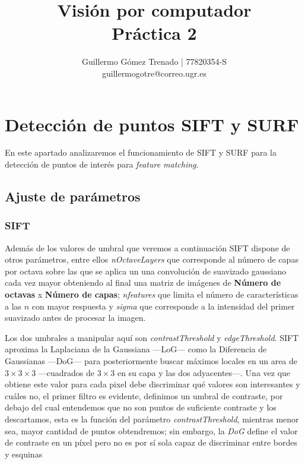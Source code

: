 \documentclass{article}
\title{Visión por computador\\
Práctica 2}
\author{Guillermo G\'omez Trenado | 77820354-S \\
guillermogotre@correo.ugr.es}
\begin{document}

\maketitle

\tableofcontents

\newpage

\section{Detección de puntos SIFT y SURF}

En este apartado analizaremos el funcionamiento de SIFT y SURF para la detección de puntos de interés para \textit{feature matching}.

\subsection{Ajuste de parámetros}

\subsubsection{SIFT}

Además de los valores de umbral que veremos a continuación SIFT dispone de otros parámetros, entre ellos \textit{nOctaveLayers} que corresponde al número de capas por octava sobre las que se aplica un una convolución de suavizado gaussiano cada vez mayor obteniendo al final una matriz de imágenes de \textbf{Número de octavas} x \textbf{Número de capas}; \textit{nfeatures} que limita el número de características a las $n$ con mayor respuesta y \textit{sigma} que corresponde a la intensidad del primer suavizado antes de procesar la imagen.

Los dos umbrales a manipular aquí son \textit{contrastThreshold} y \textit{edgeThreshold}. SIFT aproxima la Laplaciana de la Gaussiana ---LoG--- como la Diferencia de Gaussianas ---DoG--- para posteriormente buscar máximos locales en un area de $3\times3\times3$ ---cuadrados de $3\times3$ en su capa y las dos adyacentes---. Una vez que obtiene este valor para cada pixel debe discriminar qué valores son interesantes y cuáles no, el primer filtro es evidente, definimos un umbral de contraste, por debajo del cual entendemos que no son puntos de suficiente contraste y los descartamos, esta es la función del parámetro \textit{contrastThreshold}, mientras menor sea, mayor cantidad de puntos obtendremos; sin embargo, la \textit{DoG} define el valor de contraste en un píxel pero no es por sí sola capaz de discriminar entre bordes y esquinas
\end{document}
